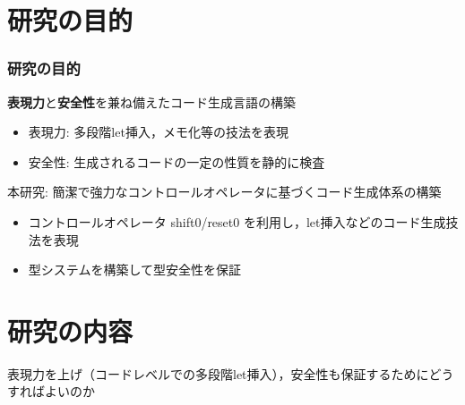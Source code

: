 
\section{研究の目的}
\begin{frame}
  \frametitle{研究の目的}

  \begin{block}{\textbf{表現力}と\textbf{安全性}を兼ね備えたコード生成言語の構築}
    \begin{itemize}
    \item 表現力: 多段階let挿入，メモ化等の技法を表現
    \item 安全性: 生成されるコードの一定の性質を静的に検査
    \end{itemize}
  \end{block}

  \medskip
  \pause
  \begin{block}{本研究: 簡潔で強力なコントロールオペレータに基づくコード生成体系の構築}
    \begin{itemize}
    \item コントロールオペレータ shift0/reset0 を利用し，let挿入などのコード生成技法を表現
    \item 型システムを構築して型安全性を保証
    \end{itemize}
  \end{block}
\end{frame}

\section{研究の内容}

\begin{frame}
  \center
  \huge{表現力を上げ（コードレベルでの多段階let挿入），安全性も保証するためにどうすればよいのか}
\end{frame}


